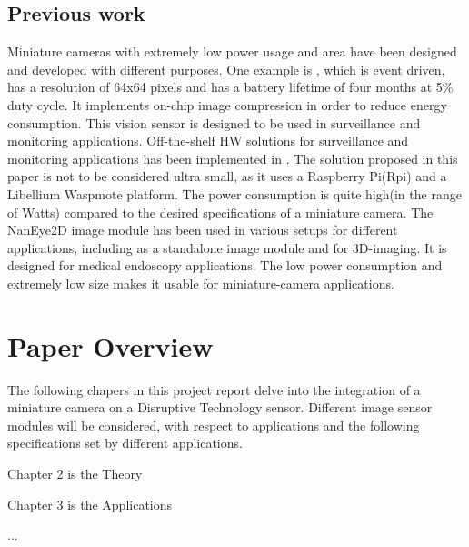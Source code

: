 \subsection{Previous work}
Miniature cameras with extremely low power usage and area have been designed and developed with different purposes. One example is \cite{CMOS Ultra-Low Power}, which is event driven, has a resolution of 64x64 pixels and has a battery lifetime of four months at 5\% duty cycle. It implements on-chip image compression in order to reduce energy consumption. This vision sensor is designed to be used in surveillance and monitoring applications. 
Off-the-shelf HW solutions for surveillance and monitoring applications has been implemented in \cite{Off_the_shelf_HW}. The solution proposed in this paper is not to be considered ultra small, as it uses a Raspberry Pi(Rpi) and a Libellium Waspmote platform. The power consumption is quite high(in the range of Watts) compared to the desired specifications of a miniature camera. 
The NanEye2D image module \cite{NanEye_datasheet} has been used in various setups for different applications, including as a standalone image module\cite{Eyes_of_things_NanEye} and for 3D-imaging\cite{NanEye_3D}. It is designed for medical endoscopy applications. The low power consumption and extremely low size makes it usable for miniature-camera applications.  

\section{Paper Overview}
The following chapers in this project report delve into the integration of a miniature camera on a Disruptive Technology sensor. Different image sensor modules will be considered, with respect to applications and the following specifications set by different applications.  

Chapter 2 is the Theory

Chapter 3 is the Applications

...


